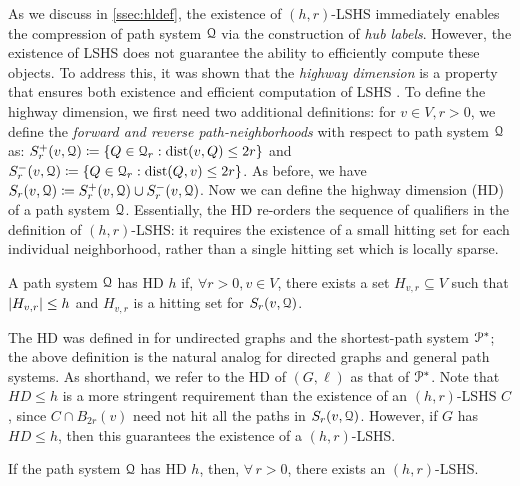 As we discuss in \cref{ssec:hldef}, the existence of $(h,r)$-LSHS immediately enables the compression of path system $\calQ$ via the construction of \emph{hub labels}. 
However, the existence of LSHS does not guarantee the ability to efficiently compute these objects. 
To address this, it was shown that the \emph{highway dimension} is a property that ensures both existence and efficient computation of LSHS \cite{highway2013}. 
To define the highway dimension, we first need two additional definitions:
for $v\in V, r>0$, we define the \emph{forward and reverse path-neighborhoods} with respect to path system $\calQ$ as: $
S_r^+(v,\calQ) \defeq\crl*{Q\in\calQ_r: \dist(v,Q)\leq 2r}$ and  $S_r^-(v,\calQ) \defeq\crl*{Q\in\calQ_r: \dist(Q,v)\leq 2r}$.
As before, we have $S_r(v,\calQ) \defeq S_r^+(v,\calQ)\cup S_r^-(v,\calQ)$. Now we can define the highway dimension (HD) of a path system $\calQ$. Essentially, the HD re-orders the sequence of qualifiers in the definition of $(h,r)$-LSHS: it requires the existence of a small hitting set for each individual neighborhood, rather than a single hitting set which is locally sparse. 
\begin{definition}	\label{def:hddef}
	A path system $\calQ$ has HD $h$ if, $\forall r>0,v\in V$, there exists a set $H_{v,r}\subseteq V$ such that $\card{H_{v,r}}\leq h$ and $H_{v,r}$ is a hitting set for $S_r(v,\calQ)$.
\end{definition}

The HD was defined in \cite{highway2013} for undirected graphs and the shortest-path system $\PS$; the above definition is the natural analog for directed graphs and general path systems.
As shorthand, we refer to the HD of $(G,\ell)$ as that of $\PS$. 
Note that $HD\leq h$ is a more stringent requirement than the existence of an $(h,r)$-LSHS $C$, since $C\cap B_{2r}(v)$ need not hit all the paths in $S_r(v,\calQ)$. 
However, if $G$ has $HD \leq h$, then this guarantees the existence of a $(h,r)$-LSHS.
\begin{proposition}\label{prop:equiv}
If the path system $\calQ$ has HD $h$, then, $\forall\,r>0$, there exists an $(h,r)$-LSHS.
\end{proposition}


